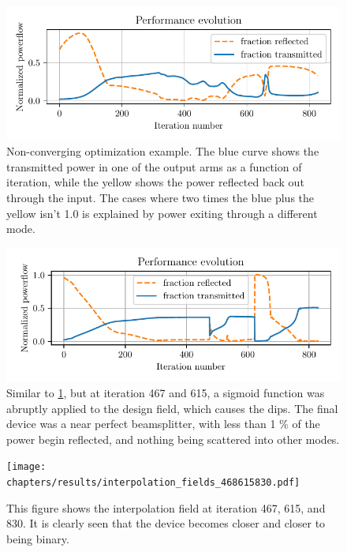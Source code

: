 \begin{figure}[htpb]
	\centering
	\includegraphics{chapters/results/conv_22.pdf}
	\caption{%
		Non-converging optimization example. The blue curve shows the
		transmitted power in one of the output arms as a function of iteration,
		while the yellow shows the power reflected back out through the input.
		The cases where two times the blue plus the yellow isn't 1.0 is
		explained by power exiting through a different mode.
	}%
	\label{fig:bad_cont_conv}
\end{figure}

\begin{figure}[htpb]
	\centering
	\includegraphics{chapters/results/conv_31.pdf}
	\caption{
		Similar to \cref{fig:bad_cont_conv},
		but at iteration 467 and 615, a sigmoid function was abruptly applied
		to the design field, which causes the dips.
		The final device was a near perfect beamsplitter, with less than 1 \% of
		the power begin reflected, and nothing being scattered into other modes.
	}%
	\label{fig:cont_conv1}
\end{figure}

\begin{figure}[htpb]
	\centering
	\texttt{[image: chapters/results/interpolation\_fields\_468615830.pdf]}
	\caption{This figure shows the interpolation field at iteration 467, 615,
		and 830. It is clearly seen that the device becomes closer and closer to
		being binary.
	}%
	\label{fig:cont_design1}
\end{figure}

